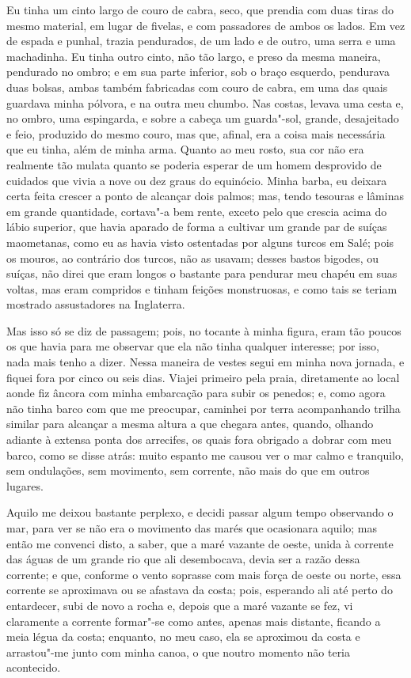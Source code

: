 Eu tinha um cinto largo de couro de cabra, seco, que prendia com duas
tiras do mesmo material, em lugar de fivelas, e com passadores de ambos
os lados. Em vez de espada e punhal, trazia pendurados, de um lado e de
outro, uma serra e uma machadinha. Eu tinha outro cinto, não tão largo,
e preso da mesma maneira, pendurado no ombro; e em sua parte inferior,
sob o braço esquerdo, pendurava duas bolsas, ambas também fabricadas com
couro de cabra, em uma das quais guardava minha pólvora, e na outra meu
chumbo. Nas costas, levava uma cesta e, no ombro, uma espingarda, e
sobre a cabeça um guarda"-sol, grande, desajeitado e feio, produzido do
mesmo couro, mas que, afinal, era a coisa mais necessária que eu tinha,
além de minha arma. Quanto ao meu rosto, sua cor não era realmente tão
mulata quanto se poderia esperar de um homem desprovido de cuidados que
vivia a nove ou dez graus do equinócio. Minha barba, eu deixara certa
feita crescer a ponto de alcançar dois palmos; mas, tendo tesouras e
lâminas em grande quantidade, cortava"-a bem rente, exceto pelo que
crescia acima do lábio superior, que havia aparado de forma a cultivar
um grande par de suíças maometanas, como eu as havia visto ostentadas
por alguns turcos em Salé; pois os mouros, ao contrário dos turcos, não
as usavam; desses bastos bigodes, ou suíças, não direi que eram longos o
bastante para pendurar meu chapéu em suas voltas, mas eram compridos e
tinham feições monstruosas, e como tais se teriam mostrado assustadores
na Inglaterra.

Mas isso só se diz de passagem; pois, no tocante à minha figura, eram
tão poucos os que havia para me observar que ela não tinha qualquer
interesse; por isso, nada mais tenho a dizer. Nessa maneira de vestes
segui em minha nova jornada, e fiquei fora por cinco ou seis dias.
Viajei primeiro pela praia, diretamente ao local aonde fiz âncora com
minha embarcação para subir os penedos; e, como agora não tinha barco
com que me preocupar, caminhei por terra acompanhando trilha similar
para alcançar a mesma altura a que chegara antes, quando, olhando
adiante à extensa ponta dos arrecifes, os quais fora obrigado a dobrar
com meu barco, como se disse atrás: muito espanto me causou ver o mar
calmo e tranquilo, sem ondulações, sem movimento, sem corrente, não mais
do que em outros lugares.

Aquilo me deixou bastante perplexo, e decidi passar algum tempo
observando o mar, para ver se não era o movimento das marés que
ocasionara aquilo; mas então me convenci disto, a saber, que a maré
vazante de oeste, unida à corrente das águas de um grande rio que ali
desembocava, devia ser a razão dessa corrente; e que, conforme o vento
soprasse com mais força de oeste ou norte, essa corrente se aproximava
ou se afastava da costa; pois, esperando ali até perto do entardecer,
subi de novo a rocha e, depois que a maré vazante se fez, vi claramente
a corrente formar"-se como antes, apenas mais distante, ficando a meia
légua da costa; enquanto, no meu caso, ela se aproximou da costa e
arrastou"-me junto com minha canoa, o que noutro momento não teria
acontecido.

